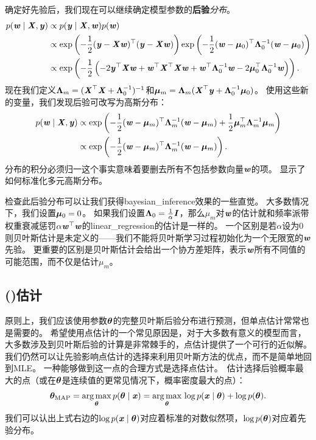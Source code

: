 确定好先验后，我们现在可以继续确定模型参数的\textbf{后验}\emph{分布}。
\begin{align}
    p(\Vw \mid \MX, \Vy) &\propto p(\Vy \mid \MX, \Vw) p(\Vw) \\
    & \propto 
        \exp\left( 
            -\frac{1}{2} ( \Vy - \MX\Vw )^\Tsp( \Vy - \MX\Vw )
        \right)
        \exp\left(
    -\frac{1}{2} ( \Vw - \Vmu_0)^\Tsp \VLambda_0^{-1} ( \Vw - \Vmu_0)
        \right) \\
    & \propto \exp
    \left(
    -\frac{1}{2}\left(
    -2\Vy^\Tsp\MX\Vw + \Vw^\Tsp\MX^\Tsp\MX\Vw + \Vw^\Tsp\VLambda_0^{-1}\Vw - 
    2\Vmu_0^\Tsp \VLambda_0^{-1}\Vw
    \right)
    \right).
\end{align}
现在我们定义$\VLambda_m = (\MX^\Tsp\MX + \VLambda_0^{-1})^{-1}$和$\Vmu_m = \VLambda_m ( \MX^\Tsp \Vy + \VLambda_0^{-1}\Vmu_0 )$。
使用这些新的变量，我们发现后验可改写为高斯分布：
\begin{align}
    p(\Vw \mid \MX, \Vy) &\propto \exp \left(
    -\frac{1}{2} (\Vw - \Vmu_m )^\Tsp \VLambda_m^{-1}  (\Vw - \Vmu_m ) 
    + \frac{1}{2} \Vmu_m^\Tsp \VLambda_m^{-1}  \Vmu_m 
    \right) \\
    &\propto \exp\left(
    -\frac{1}{2} (\Vw - \Vmu_m)^\Tsp \VLambda_m^{-1} (\Vw - \Vmu_m)
    \right).
\end{align}
分布的积分必须归一这个事实意味着要删去所有不包括参数向量$\Vw$的项。
显示了如何标准化多元高斯分布。


检查此后验分布可以让我们获得\gls{bayesian_inference}效果的一些直觉。
大多数情况下，我们设置$\Vmu_0 = 0$。
如果我们设置$\VLambda_0 = \frac{1}{\alpha}\MI$，那么$\mu_m$对$\Vw$的估计就和频率派带权重衰减惩罚$\alpha\Vw^\Tsp\Vw$的\gls{linear_regression}的估计是一样的。
一个区别是若$\alpha$设为$0$则贝叶斯估计是未定义的——我们不能将贝叶斯学习过程初始化为一个无限宽的$\Vw$先验。
更重要的区别是贝叶斯估计会给出一个协方差矩阵，表示$\Vw$所有不同值的可能范围，而不仅是估计$\mu_m$。

\subsection{()估计}
\label{sec:maximum_a_posteriori_map_estimation}
原则上，我们应该使用参数$\Vtheta$的完整贝叶斯后验分布进行预测，但单点估计常常也是需要的。
希望使用点估计的一个常见原因是，对于大多数有意义的模型而言，大多数涉及到贝叶斯后验的计算是非常棘手的，点估计提供了一个可行的近似解。
我们仍然可以让先验影响点估计的选择来利用贝叶斯方法的优点，而不是简单地回到\gls{MLE}。
一种能够做到这一点的合理方式是选择点估计。
\,估计选择后验概率最大的点（或在$\Vtheta$是连续值的更常见情况下，概率密度最大的点）：
\begin{equation}
\label{eq:5.79}
    \Vtheta_{\text{MAP}} = \underset{\Vtheta}{\argmax} \, p(\Vtheta\mid\Vx)
    = \underset{\Vtheta}{\argmax} \, \log p(\Vx \mid \Vtheta) + \log p(\Vtheta) .
\end{equation}
我们可以认出上式右边的$\log p(\Vx \mid \Vtheta)$对应着标准的对数似然项，$\log p(\Vtheta)$对应着先验分布。

